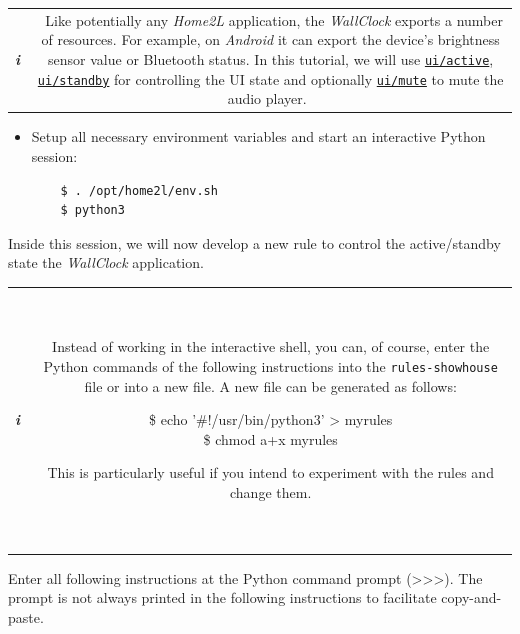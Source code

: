 \documentclass[12pt,english,parskip=half]{scrreprt}
\newcommand{\lst}[1]{\colorbox{lstbackground}{\ttfamily\footnotesize#1}}
\newcommand{\lstbox}[1]{
  \par
  \colorbox{lstbackground}{\ttfamily\footnotesize{\parbox{\linewidth}{#1}}}
  \par
}
\newcommand{\infobox}[1]{
  \hfill
  \setlength\arrayrulewidth{1pt}
  \begin{tabular}[t]{c|c|}
    \parbox{1.8em}{\hfill\textit{\Huge\textbf{i}\,}}
    &
    \,\parbox{0.89\linewidth}{\setlength{\parskip}{0.5em}#1}\,
  \end{tabular}
  \par
}
\newcommand{\rcref}[1]{\hyperref[rc:#1]{\texttt{#1}}}
\begin{document}
\infobox{
  Like potentially any \emph{Home2L} application, the \emph{WallClock}
  exports a number of resources. For example, on \emph{Android} it can export
  the device's brightness sensor value or Bluetooth status. In this tutorial, we will use
  \rcref{ui/active}, \rcref{ui/standby} for controlling the UI state and optionally
  \rcref{ui/mute} to mute the audio player.
}

\begin{itemize}[$\blacktriangleright$]

\item
  Setup all necessary environment variables and start an interactive Python session:
  \begin{lstlisting}
    $ . /opt/home2l/env.sh
    $ python3
  \end{lstlisting}

  \end{itemize}

Inside this session, we will now develop a new rule to control the
active/standby state the \emph{WallClock} application.

\infobox{
  Instead of working in the interactive shell, you can, of course, enter the
  Python commands of the following instructions into the \texttt{rules-showhouse}
  file or into a new file. A new file can be generated as follows:
  \lstbox{
    \$ echo '\#!/usr/bin/python3' > myrules \\
    \$ chmod a+x myrules
  }
  This is particularly useful if you intend to experiment with the rules and change them.
}

Enter all following instructions at the Python command prompt
(\lst{\mbox{\textgreater}\mbox{\textgreater}\mbox{\textgreater}}).
The prompt is not always printed in the following instructions to facilitate copy-and-paste.
\end{document}
